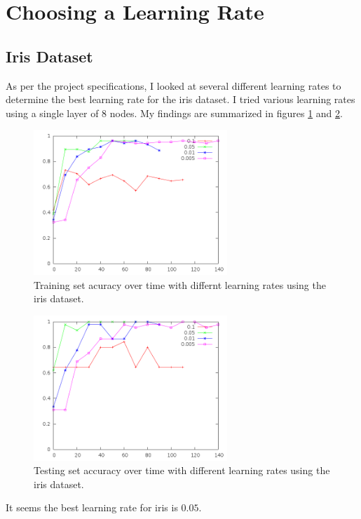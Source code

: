 \documentclass[12pt]{article}
\begin{document}
 \section{Choosing a Learning Rate}
 \subsection{Iris Dataset}

As per the project specifications, I looked at several different learning rates
to determine the best learning rate for the iris dataset. I tried various
learning rates using a single layer of 8 nodes. My findings are summarized in
figures \ref{fig:iris_learningrate_training} and
\ref{fig:iris_learningrate_testing}.
\begin{figure}[!ht]
    \begin{center}
        \includegraphics[width=0.65\textwidth]{iris-learningrate-training}
    \end{center}
    \caption{Training set acuracy over time with differnt learning rates using the iris dataset.}
  \label{fig:iris_learningrate_training}
\end{figure}

\begin{figure}[!ht]
    \begin{center}
        \includegraphics[width=0.65\textwidth]{iris-learningrate-testing}
    \end{center}
    \caption{Testing set accuracy over time with different learning rates using the iris dataset.}
  \label{fig:iris_learningrate_testing}
\end{figure}
It seems the best learning rate for iris is $0.05$.
\end{document}

